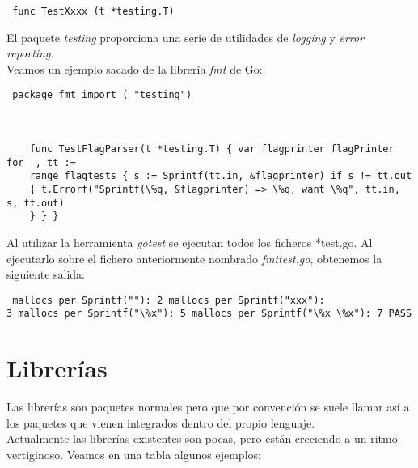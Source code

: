 \begin{verbatim} func TestXxxx (t *testing.T) \end{verbatim}

El paquete \textit{testing} proporciona una serie de utilidades de
\textit{logging} y \textit{error reporting}.\\

Veamos un ejemplo sacado de la librería \textit{fmt} de Go:

\begin{verbatim} package fmt import ( "testing")
    
    
    
	func TestFlagParser(t *testing.T) { var flagprinter flagPrinter for _, tt :=
	range flagtests { s := Sprintf(tt.in, &flagprinter) if s != tt.out
	{ t.Errorf("Sprintf(\%q, &flagprinter) => \%q, want \%q", tt.in, s, tt.out)
	} } } \end{verbatim}

Al utilizar la herramienta \textit{gotest} se ejecutan todos los ficheros
*\textunderscore test.go. Al ejecutarlo sobre el fichero anteriormente nombrado
\textit{fmt\textunderscore test.go}, obtenemos la siguiente salida:

\begin{verbatim} mallocs per Sprintf(""): 2 mallocs per Sprintf("xxx"):
3 mallocs per Sprintf("\%x"): 5 mallocs per Sprintf("\%x \%x"): 7 PASS
\end{verbatim}

\section{Librerías}

Las librerías son paquetes normales pero que por convención se suele llamar así
a los paquetes que vienen integrados dentro del propio lenguaje.\\

Actualmente las librerías existentes son pocas, pero están creciendo a un ritmo
vertiginoso. Veamos en una tabla algunos ejemplos:

